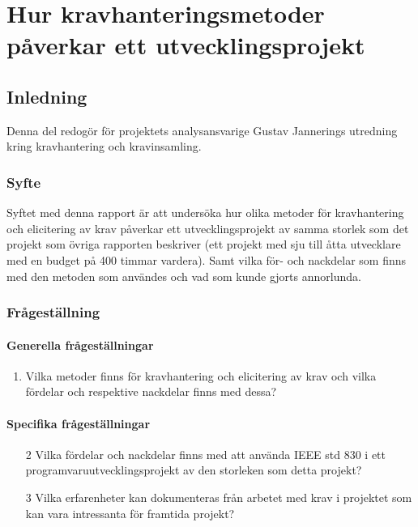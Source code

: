 \chapter{Hur kravhanteringsmetoder påverkar ett utvecklingsprojekt}
\label{cha:indiv-report-jannering}

\section{Inledning}
\label{sec:introduction-jannering}

Denna del redogör för projektets analysansvarige Gustav Jannerings utredning kring kravhantering och kravinsamling.

\subsection{Syfte}
\label{sec:purpose-jannering}


Syftet med denna rapport är att undersöka hur olika metoder för kravhantering och elicitering av krav påverkar ett utvecklingsprojekt av samma storlek som det projekt som övriga rapporten beskriver (ett projekt med sju till åtta utvecklare med en budget på 400 timmar vardera). Samt vilka för- och nackdelar som finns med den metoden som användes och vad som kunde gjorts annorlunda.

\subsection{Frågeställning}
\label{sec:issue-jannering}

\subsubsection{Generella frågeställningar}
\begin{enumerate}
	\item Vilka metoder finns för kravhantering och elicitering av krav och vilka fördelar och respektive nackdelar finns med dessa? 
\end{enumerate}
\subsubsection{Specifika frågeställningar}
\begin{enumerate}
	\item [2] Vilka fördelar och nackdelar finns med att använda IEEE std 830 i ett programvaruutvecklingsprojekt av den storleken som detta projekt?
	
	\item [3] Vilka erfarenheter kan dokumenteras från arbetet med krav i projektet som kan vara intressanta för framtida projekt?
	
\end{enumerate}
